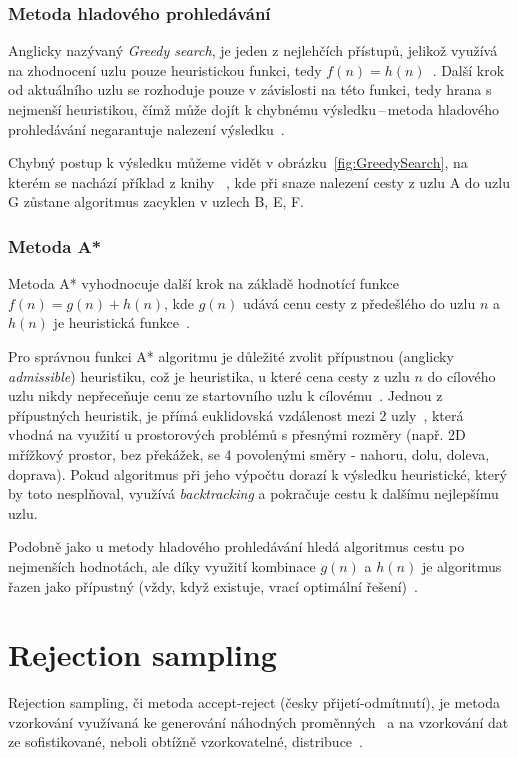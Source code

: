 \subsubsection*{\textbullet Metoda hladového prohledávání}
Anglicky nazývaný \textit{Greedy search}, je jeden z nejlehčích přístupů, jelikož využívá na zhodnocení uzlu pouze heuristickou funkci, tedy ${f(n) = h(n)}$~\cite{AI-Modern_approach}. Další krok od aktuálního uzlu se rozhoduje pouze v závislosti na této funkci, tedy hrana s nejmenší heuristikou, čímž může dojít k chybnému výsledku\,--\,metoda hladového prohledávání negarantuje nalezení výsledku~\cite{poole2023artificial}. 

Chybný postup k výsledku můžeme vidět v obrázku~\ref{fig:GreedySearch}, na kterém se nachází příklad z knihy ~\cite{poole2023artificial}, kde při snaze nalezení cesty z uzlu A do uzlu G zůstane algoritmus zacyklen v uzlech B, E, F.

\subsubsection*{\textbullet Metoda A*}
Metoda A* vyhodnocuje další krok na základě hodnotící funkce ${f(n) = g(n) + h(n)}$, kde ${g(n)}$ udává cenu cesty z předešlého do uzlu ${n}$ a ${h(n)}$ je heuristická funkce~\cite{AI-Modern_approach}. 

Pro správnou funkci A* algoritmu je důležité zvolit přípustnou (anglicky \textit{admissible}) heuristiku, což je heuristika, u které cena cesty z uzlu ${n}$ do cílového uzlu nikdy nepřeceňuje cenu ze startovního uzlu k cílovému~\cite{AI-Modern_approach, izu}. Jednou z přípustných heuristik, je přímá euklidovská vzdálenost mezi 2 uzly~\cite{poole2023artificial}, která vhodná na využití u prostorových problémů s přesnými rozměry (např. 2D mřížkový prostor, bez překážek, se 4 povolenými směry - nahoru, dolu, doleva, doprava). Pokud algoritmus při jeho výpočtu dorazí k výsledku heuristické, který by toto nesplňoval, využívá \textit{backtracking} a pokračuje cestu k dalšímu nejlepšímu uzlu.

Podobně jako u metody hladového prohledávání hledá algoritmus cestu po nejmenších hodnotách, ale díky využití kombinace ${g(n)}$ a ${h(n)}$ je algoritmus řazen jako přípustný (vždy, když existuje, vrací optimální řešení)~\cite{poole2023artificial}.
    
\section{Rejection sampling}
Rejection sampling, či metoda accept-reject (česky přijetí-odmítnutí), je metoda vzorkování využívaná ke generování náhodných proměnných~\cite{thomopoulos2012essentials} a na vzorkování dat ze sofistikované, neboli obtížně vzorkovatelné, distribuce~\cite{Sachdeva_2021}.

